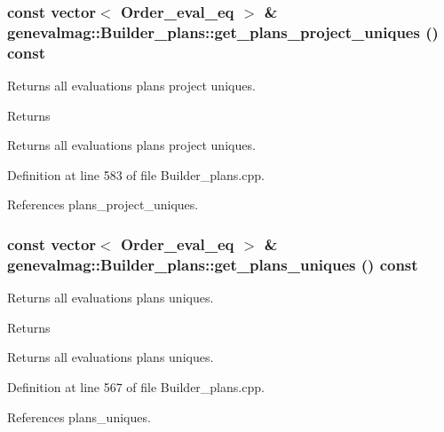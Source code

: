\hypertarget{classgenevalmag_1_1Builder__plans_aa4f340be44a4b2592c8f5aaabf88305e}{
\subsubsection[{get\_\-plans\_\-project\_\-uniques}]{\setlength{\rightskip}{0pt plus 5cm}const vector$<$ {\bf Order\_\-eval\_\-eq} $>$ \& genevalmag::Builder\_\-plans::get\_\-plans\_\-project\_\-uniques () const}}
\label{classgenevalmag_1_1Builder__plans_aa4f340be44a4b2592c8f5aaabf88305e}
Returns all evaluations plans project uniques. \begin{DoxyReturn}{Returns}

\end{DoxyReturn}
Returns all evaluations plans project uniques. 

Definition at line 583 of file Builder\_\-plans.cpp.



References plans\_\-project\_\-uniques.

\hypertarget{classgenevalmag_1_1Builder__plans_ad5d96d5e07170749447ff69b3282cd3d}{
\subsubsection[{get\_\-plans\_\-uniques}]{\setlength{\rightskip}{0pt plus 5cm}const vector$<$ {\bf Order\_\-eval\_\-eq} $>$ \& genevalmag::Builder\_\-plans::get\_\-plans\_\-uniques () const}}
\label{classgenevalmag_1_1Builder__plans_ad5d96d5e07170749447ff69b3282cd3d}
Returns all evaluations plans uniques. \begin{DoxyReturn}{Returns}

\end{DoxyReturn}
Returns all evaluations plans uniques. 

Definition at line 567 of file Builder\_\-plans.cpp.



References plans\_\-uniques.



